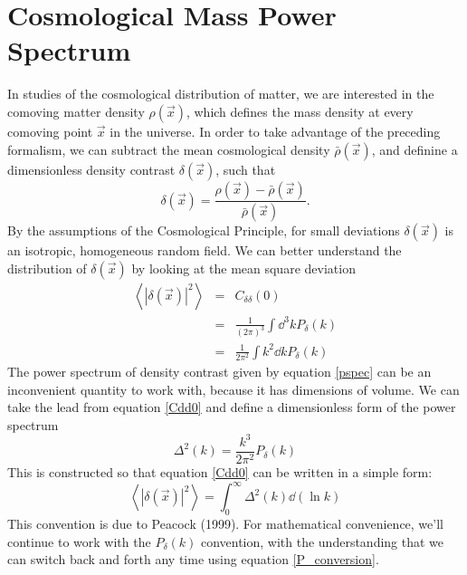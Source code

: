 \section{Cosmological Mass Power Spectrum}
\label{app:sec:masspower}
In studies of the cosmological distribution of matter, we are interested
in the comoving matter density $\rho(\vec{x})$, which defines the mass 
density at every comoving point $\vec{x}$ in the universe.  In order
to take advantage of the preceding formalism, we can subtract the mean
cosmological density $\bar{\rho}(\vec{x})$, and definine a dimensionless
density contrast $\delta(\vec{x})$, such that
\begin{equation}
  \delta(\vec{x}) = \frac{\rho(\vec{x}) - \bar{\rho}(\vec{x})}{\bar{\rho}(\vec{x})}.
\end{equation}
By the assumptions of the Cosmological Principle, for small
deviations $\delta(\vec x)$ is an isotropic, homogeneous random field.  
We can better understand the distribution of $\delta(\vec x)$ by looking
at the mean square deviation
\begin{eqnarray}
  \label{Cdd0}
  \left\langle|\delta(\vec x)|^2\right\rangle 
  &=& C_{\delta\delta}(0)\nonumber\\
  &=& \frac{1}{(2\pi)^3}\int \dd^3 kP_\delta(k)\nonumber\\
  &=& \frac{1}{2\pi^2}\int k^2\dd k P_\delta(k)
\end{eqnarray}
The power spectrum of density contrast given by equation \ref{pspec}
can be an inconvenient quantity to work with, because it has dimensions
of volume.  We can take the lead from equation \ref{Cdd0} and define
a dimensionless form of the power spectrum
\begin{equation}
  \label{P_conversion}
 \Delta^2(k) = \frac{k^3}{2\pi^2} P_\delta(k)
\end{equation}
This is constructed so that equation \ref{Cdd0} can be written in a
simple form:
\begin{equation}
  \left\langle|\delta(\vec x)|^2\right\rangle 
  = \int_0^\infty \Delta^2(k)\dd(\ln k)
\end{equation}
This convention is due to Peacock (1999).
For mathematical convenience, we'll continue to work with 
the $P_\delta(k)$ convention,
with the understanding that we can switch back and forth any time using
equation \ref{P_conversion}. 

